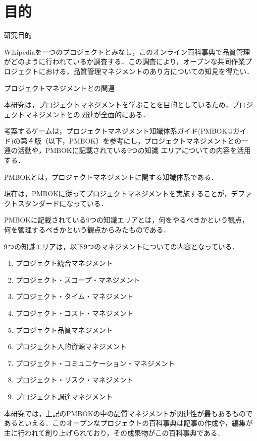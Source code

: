 \chapter{目的}

研究目的

Wikipediaを一つのプロジェクトとみなし，このオンライン百科事典で品質管理がどのように行われているか調査する．この調査により，オープンな共同作業プロジェクトにおける，品質管理マネジメントのあり方についての知見を得たい．


プロジェクトマネジメントとの関連

本研究は，プロジェクトマネジメントを学ぶことを目的としているため，プロジェクトマネジメントとの関連が全面的にある．

考案するゲームは，プロジェクトマネジメント知識体系ガイド(PMBOK@ガイド)の第４版（以下，PMBOK）を参考にし，プロジェクトマネジメントとの一連の活動や，PMBOKに記載されている9つの知識
エリアについての内容を活用する．\cite{PMBOK}

PMBOKとは，プロジェクトマネジメントに関する知識体系である．

現在は，PMBOKに従ってプロジェクトマネジメントを実施することが，デファクトスタンダードになっている．

PMBOKに記載されている9つの知識エリアとは，何をやるべきかという観点，何を管理するべきかという観点からみたものである．

9つの知識エリアは，以下9つのマネジメントについての内容となっている．


\begin{enumerate}
 \item プロジェクト統合マネジメント
 \item プロジェクト・スコープ・マネジメント
 \item プロジェクト・タイム・マネジメント
 \item プロジェクト・コスト・マネジメント
 \item プロジェクト品質マネジメント
 \item プロジェクト人的資源マネジメント
 \item プロジェクト・コミュニケーション・マネジメント
 \item プロジェクト・リスク・マネジメント
 \item プロジェクト調達マネジメント
\end{enumerate}








本研究では，上記のPMBOKの中の品質マネジメントが関連性が最もあるものであるといえる．このオープンなプロジェクトの百科事典は記事の作成や，編集が主に行われて創り上げられており，その成果物がこの百科事典である．


